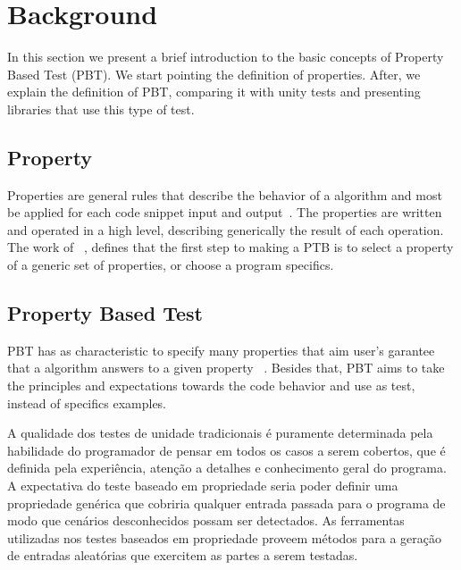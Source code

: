 \section{Background} \label{sec:back}

	In this section we present a brief introduction to the basic concepts of Property Based Test (PBT). We start pointing the definition of properties. After, we explain the definition of PBT, comparing it with unity tests and presenting libraries that use this type of test.
	  
	\subsection{Property}
	
	Properties are general rules that describe the behavior of a algorithm and most be applied for each code snippet input and output~\cite{9781680506211}. The properties are written and operated in a high level, describing generically the result of each operation.
	The work of ~\cite{fink1997property}, defines that the first step to making a PTB is to select a property of a generic set of properties, or choose a program specifics.
	 
	\subsection{Property Based Test}

	PBT has as characteristic to specify many properties that aim user's garantee that a algorithm answers to a given property ~\cite{fink1997property}. Besides that, PBT aims to take the principles and expectations towards the code behavior and use as test, instead of specifics examples.

	A qualidade dos testes de unidade tradicionais é puramente determinada pela habilidade do programador de pensar em todos os casos a serem cobertos, que é definida pela experiência, atenção a detalhes e conhecimento geral do programa. A expectativa do teste baseado em propriedade seria poder definir uma propriedade genérica que cobriria qualquer entrada passada para o programa de modo que cenários desconhecidos possam ser detectados. As ferramentas utilizadas nos testes baseados em propriedade proveem métodos para a geração de entradas aleatórias que exercitem as partes a serem testadas.
	 

